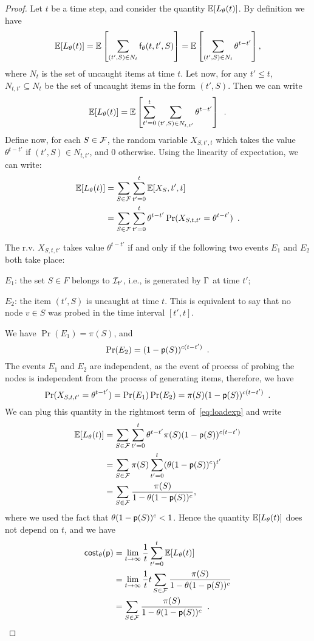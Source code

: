 \begin{proof}
	Let $t$ be a time step, and consider the quantity $\mathbb{E}[L_\theta(t)]$. By
	definition we have
	\[
		\mathbb{E}[L_\theta(t)]=\mathbb{E}\left[\sum_{(t',S)\in
		N_t}\mathsf{f}_\theta(t,t',S)\right]=\mathbb{E}\left[\sum_{(t',S)\in
		N_t}\theta^{t-t'}\right],
	\]
	where $N_t$ is the set of uncaught items at time $t$. Let now, for any
	$t'\le t$, $N_{t,t'}\subseteq N_t$ be the set of uncaught items in the form
	$(t',S)$. Then we can write
	\[
		\mathbb{E}[L_\theta(t)]=\mathbb{E}\left[\sum_{t'=0}^{t}\sum_{(t',S)\in
			N_{t,t'}}\theta^{t-t'}\right]\enspace.
	\]
	Define now, for each $S\in\mathcal{F}$, the random variable $X_{S,t',t}$ which
	takes the value $\theta^{t-t'}$ if $(t',S)\in N_{t,t'}$, and $0$ otherwise.
	Using the linearity of expectation, we can write:
	\begin{align}\label{eq:loadexp}
		\mathbb{E}[L_\theta(t)]&=\sum_{S\in\mathcal{F}}\sum_{t'=0}^t\mathbb{E}[X_S,t',t]\nonumber\\
		&=\sum_{S\in\mathcal{F}}\sum_{t'=0}^t
		\theta^{t-t'}\Pr(X_{S,t,t'}=\theta^{t-t'})\enspace.
	\end{align}

	The r.v. $X_{S,t,t'}$ takes value $\theta^{t-t'}$ if and only if the
	following two events $E_1$ and $E_2$ both take place:
	\begin{itemize*}
		\item $E_1$: the set $S\in F$ belongs to $\mathcal{I}_{t'}$, i.e., is
			generated by $\Gamma$ at time $t'$;
		\item $E_2$: the item $(t',S)$ is uncaught at time $t$. This is
			equivalent to say that no node $v\in S$ was probed in the time
			interval $[t',t]$.
	\end{itemize*}
	We have $\Pr(E_1)=\pi(S)$, and
	\[
		\Pr(E_2)=(1-\mathsf{p}(S))^{c(t-t')}\enspace.
	\]
	The events $E_1$ and $E_2$ are independent, as the event of process of
	probing the nodes is independent from the process of generating items,
	therefore, we have
	\[
		\Pr(X_{S,t,t'}=\theta^{t-t'})=\Pr(E_1)\Pr(E_2)=\pi(S)(1-\mathsf{p}(S))^{c(t-t')}\enspace.
	\]
	We can plug this quantity in the rightmost term of~\eqref{eq:loadexp} and
	write
	\begin{align}
		\mathbb{E}[L_\theta(t)]&=\sum_{S\in\mathcal{F}}\sum_{t'=0}^t\theta^{t-t'}\pi(S)(1-\mathsf{p}(S))^{c(t-t')}\nonumber\\
		&=\sum_{S\in\mathcal{F}}\pi(S)\sum_{t'=0}^t(\theta(1-\mathsf{p}(S))^c)^{t'}\nonumber\\
		&=\sum_{S\in\mathcal{F}}\frac{\pi(S)}{1-\theta(1-\mathsf{p}(S))^c},
	\end{align}
	where we used the fact that $\theta(1-\mathsf{p}(S))^c< 1$. Hence the quantity
	$\mathbb{E}[L_\theta(t)]$ does not depend on $t$, and we have
	\begin{align*}
		\mathsf{cost}_\theta(\mathsf{p})&=\lim_{t\rightarrow\infty}\frac{1}{t}\sum_{t'=0}^t\mathbb{E}[L_\theta(t)]\\
		&=\lim_{t\rightarrow\infty}\frac{1}{t}t\sum_{S\in\mathcal{F}}\frac{\pi(S)}{1-\theta(1-\mathsf{p}(S))^c}\\
		&=
		\sum_{S\in\mathcal{F}}\frac{\pi(S)}{1-\theta(1-\mathsf{p}(S))^c}\enspace.
	\end{align*}
\end{proof}

